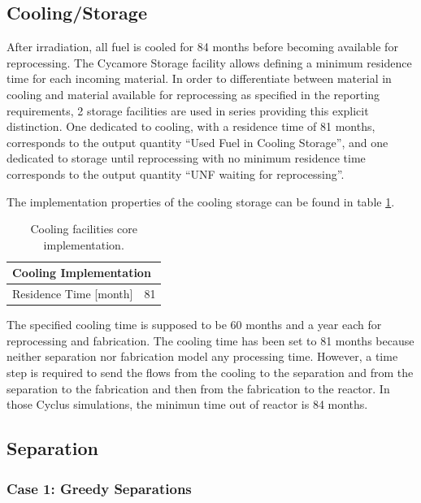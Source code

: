\documentclass[12pt]{article}
\begin{document}
\subsection{Cooling/Storage}

After irradiation, all fuel is cooled for 84 months before becoming available
for reprocessing.  The Cycamore Storage facility allows defining a minimum
residence time for each incoming material.  In order to differentiate between
material in cooling and material available for reprocessing as specified in the
reporting requirements, 2 storage facilities are used in series providing this
explicit distinction. One dedicated to cooling, with a residence time of 81
months, corresponds to the output quantity ``Used Fuel in Cooling Storage'', and
one dedicated to storage until reprocessing with no minimum residence time
corresponds to the output quantity ``UNF waiting for reprocessing''.

The implementation properties of the cooling storage can be found in table
\ref{tab:cooling_1}. 
\begin{table}[h!]
    \centering
    \begin{tabular}{ll}
    \hline
    \multicolumn{2}{l}{Cooling Implementation}  \\
    \hline
    Residence Time [month]   &  81  \\
    \hline
    \end{tabular}
    \caption{Cooling facilities core implementation.}
    \label{tab:cooling_1}
\end{table}

The specified cooling time is supposed to be 60 months and a year each for
reprocessing and fabrication. The cooling time has been set to 81 months
because neither separation nor fabrication model any processing time. However, a
time step is required to send the flows from the cooling to the separation and
from the separation to the fabrication and then from the fabrication to the
reactor. In those Cyclus simulations, the minimun time out of reactor is 84 months.

\subsection{Separation}

\subsubsection{Case 1: Greedy Separations}
\end{document}
